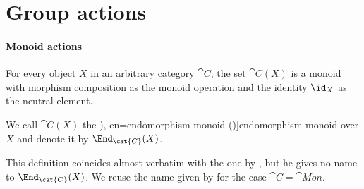 \section{Group actions}\label{sec:group_actions}

\paragraph{Monoid actions}

\begin{definition}\label{def:endomorphism_monoid}
  For every object \( X \) in an arbitrary \hyperref[def:category]{category} \( \cat{C} \), the set \( \cat{C}(X) \) is a \hyperref[def:monoid]{monoid} with morphism composition as the monoid operation and the identity \( \id_X \) as the neutral element.

  We call \( \cat{C}(X) \) the \term[ru=моноид эндоморфизмов (\cite[65]{Гуров2013ТеорияРешёток}), en=endomorphism monoid (\cite[60]{Jacobson1985BasicAlgebraI})]{endomorphism monoid} over \( X \) and denote it by \( \End_{\cat{C}}(X) \).
\end{definition}
\begin{comments}
  \item This definition coincides almost verbatim with the one by \textcite[54]{Lang2002Algebra}, but he gives no name to \( \End_{\cat{C}}(X) \). We reuse the name given by \textcite[60]{Jacobson1985BasicAlgebraI} for the case \( \cat{C} = \cat{Mon} \).
\end{comments}


